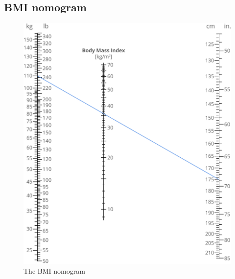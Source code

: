 \documentclass{l4proj}
\begin{document}
\begin{appendices}
\section{BMI nomogram}
\begin{figure}[H]
        \centering
        \includegraphics[width=1\linewidth]{dissertation//images//myFigures//appendix/bmi.png}
        \caption{The BMI nomogram \citep{merson-davies_body_2020}}
        \label{fig:bmi-nomogram}
    \end{figure}

\end{appendices}
\end{document}

